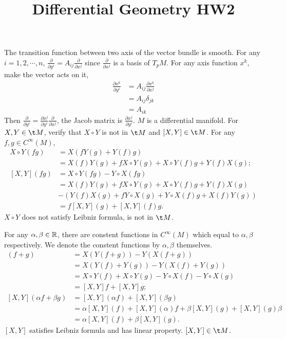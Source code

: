 

\title{Differential Geometry HW2}
\author{\asemail}
\maketitle

\begin{enumerate}
\isep[1em]

\prob The transition function between two axis of the vector bundle is smooth. 	
\soln
For any $i=1,2,\cdots,n$, $\frac{\partial}{\partial y^i}=A_{ij}\frac{\partial}{\partial x^j}$ since $\frac{\partial}{\partial x^j}$ is a basis of $T\!\!_p\!M$. For any axis function $x^k$, make the vector acts on it,
\begin{align*}
	\frac{\partial x^k}{\partial y^i}&=A_{ij}\frac{\partial x^k}{\partial x^j}
	\\ &=A_{ij} \delta_{jk}
	\\ &=A_{ik}
\end{align*}
Then $\frac{\partial}{\partial y^i}=\frac{\partial x^j}{\partial y^i}\frac{\partial}{\partial x^j}$, the Jacob matrix is $\frac{\partial x^j}{\partial y^i}$.
\prob $M$ is a differential manifold. For $X,Y\in \t M$, verify that $X\circ Y$ is not in $\t M$ and $[X,Y]\in \t M$.
\soln
	For any $f,g\in C^\infty (M)$, 
	\begin{align*}
		X\circ Y(fg)& = X(fY(g)+Y(f)g)
		\\ & = X(f) Y(g)+f X\circ Y(g)+X\circ Y(f) g+Y(f) X(g);
		\\ [X,Y](fg)& = X\circ Y(fg) - Y\circ X(fg)
		\\ & = X(f) Y(g)+f X\circ Y(g)+X\circ Y(f) g+Y(f) X(g)
		\\ & - (Y(f) X(g)+f Y\circ X(g)+Y\circ X(f) g+X(f) Y(g))
		\\ & = f[X,Y](g)+[X,Y](f)g.
	\end{align*}
$X\circ Y$ does not satisfy Leibniz formula, is not in $\t M$. 

For any $\alpha,\beta\in \mathbb{R}$, there are constent functions in $C^\infty (M)$ which equal to $\alpha,\beta$ respectively. We denote the constent functions by $\alpha,\beta$ themselves.
\begin{align*}
	[X,Y](f+g) &= X (Y(f+g))- Y(X(f+g))
	\\ & = X(Y(f)+Y(g))- Y(X(f)+Y(g))
	\\ & = X\circ Y(f)+X\circ Y(g)-Y\circ X(f)-Y\circ X(g)
	\\ & = [X,Y]f+[X,Y]g;
	\\ [X,Y](\alpha f+\beta g) &= [X,Y](\alpha f)+ [X,Y](\beta g)
	\\ &= \alpha [X,Y](f)+[X,Y](\alpha)f+\beta [X,Y](g)+[X,Y](g)\beta
	\\ &= \alpha [X,Y](f)+\beta [X,Y](g).
\end{align*}
$[X,Y]$ satisfies Leibniz formula and has linear property. $[X,Y]\in \t M$.


\end{enumerate}
